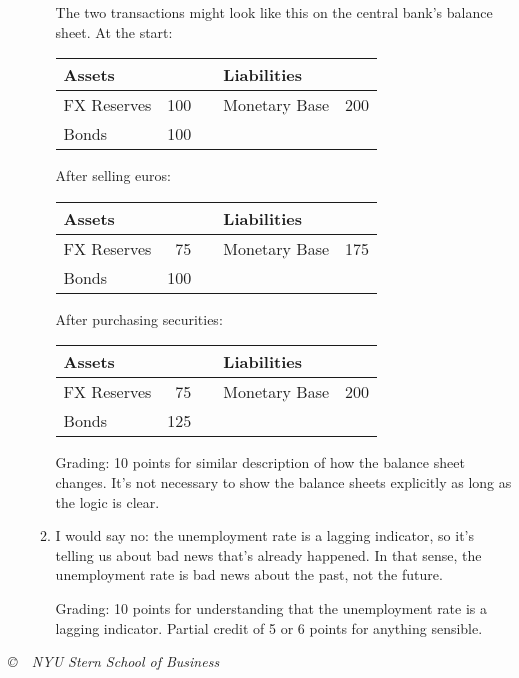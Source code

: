 \documentclass[letterpaper,12pt]{exam}
\begin{document}
\begin{enumerate}
\begin{enumerate}
The two transactions might look like this on the 
central bank's balance sheet.
At the start:  
%
\begin{center}
\begin{tabular}{lrclr}
               Assets  &     &&     Liabilities                     \\  
               \hline 
               FX Reserves &  100 &&     Monetary Base &  200   \\    
               Bonds   & 100 && \\
\end{tabular}
\end{center}
%
After selling euros:  
%
\begin{center}
\begin{tabular}{lrclr}
               Assets  &     &&     Liabilities                     \\ 
               \hline 
               FX Reserves &  75 &&     Monetary Base &  175   \\    
               Bonds   & 100 && \\
\end{tabular}
\end{center}
%
After purchasing securities:  
%
\begin{center}
\begin{tabular}{lrclr}
               Assets  &     &&     Liabilities                     \\  
               \hline 
               FX Reserves &   75 &&     Monetary Base &  200   \\    
               Bonds   & 125 && \\
\end{tabular}
\end{center}

Grading:  10 points for similar description of 
how the balance sheet changes.
It's not necessary to show the balance sheets explicitly
as long as the logic is clear.  
    
\item I would say no:  the unemployment rate is a lagging indicator, 
so it's telling us about bad news that's already happened.  
In that sense, the unemployment rate is bad news about the past, 
not the future.  

Grading:  10 points for understanding that the unemployment rate
is a lagging indicator.  
Partial credit of 5 or 6 points for anything sensible.  
\end{enumerate}

\end{enumerate}


\vfill \centerline{\it \copyright \ \number\year \ 
NYU Stern School of Business}
\end{document}

